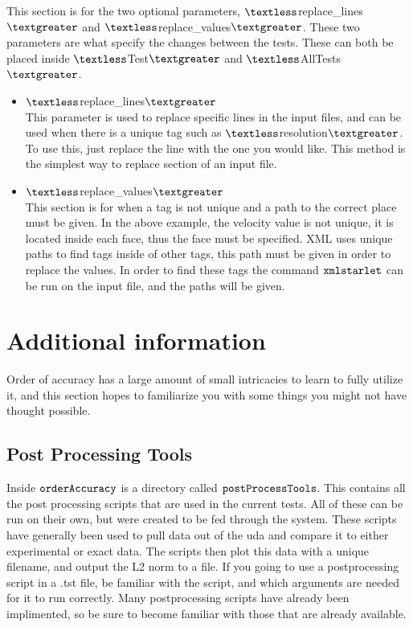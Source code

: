 This section is for the two optional parameters, $\textless$replace\_lines$\textgreater$ and $\textless$replace\_values$\textgreater$. These two parameters are what specify the changes between the tests. These can both be placed inside $\textless$Test$\textgreater$ and $\textless$AllTests$\textgreater$.
\begin{itemize}
\item $\textless$replace\_lines$\textgreater$\\
This parameter is used to replace specific lines in the input files, and can be used when there is a unique tag such as $\textless$resolution$\textgreater$. To use this, just replace the line with the one you would like. This method is the simplest way to replace section of an input file.
\item $\textless$replace\_values$\textgreater$ \\
This section is for when a tag is not unique and a path to the correct place must be given. In the above example, the velocity value is not unique, it is located inside each face, thus the face must be specified. XML uses unique paths to find tags inside of other tags, this path must be given in order to replace the values. In order to find these tags the command $\tt{xmlstarlet} \normalfont$ can be run on the input file, and the paths will be given.
\end{itemize}

\section{Additional information}
Order of accuracy has a large amount of small intricacies to learn to fully utilize it, and this section hopes to familiarize you with some things you might not have thought possible.

\subsection{Post Processing Tools}
Inside $\tt{orderAccuracy} \normalfont$ is a directory called $\tt{postProcessTools} \normalfont$. This contains all the post processing scripts that are used in the current tests. All of these can be run on their own, but were created to be fed through the system. These scripts have generally been used to pull data out of the uda and compare it to either experimental or exact data. The scripts then plot this data with a unique filename, and output the L2 norm to a file. If you going to use a postprocessing script in a .tst file, be familiar with the script, and which arguments are needed for it to run correctly. Many postprocessing scripts have already been implimented, so be sure to become familiar with those that are already available.


